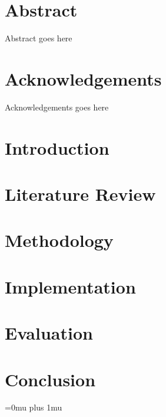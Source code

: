 \documentclass[oneside,12pt]{book}
\begin{document}

\frontmatter


\chapter{Abstract}
Abstract goes here

\chapter{Acknowledgements}
Acknowledgements goes here

\tableofcontents

\listoftables

\listoffigures

\printglossary[type=\acronymtype,title=Abbreviations,nonumberlist]

\mainmatter

\chapter{Introduction}


\chapter{Literature Review}


\chapter{Methodology}


\chapter{Implementation}


\chapter{Evaluation}


\chapter{Conclusion}




\newpage
\Urlmuskip=0mu plus 1mu


\end{document}
